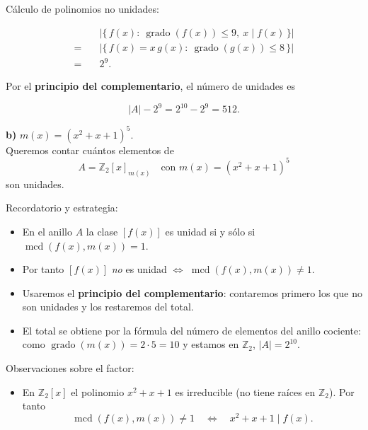 \documentclass[a4paper,12pt]{article}
\begin{document}
\begin{ejercicio}[title=Ejercicio 10]
\vspace{0.5em}

Cálculo de polinomios no unidades:

\[
\begin{aligned}
&\left|\{\,f(x):\ \operatorname{grado}(f(x))\le 9,\ x\mid f(x)\,\}\right| \\
=\quad&\left|\{\,f(x)=x\,g(x):\ \operatorname{grado}(g(x))\le 8\,\}\right| \\
=\quad&2^{9}.
\end{aligned}
\]

Por el \textbf{principio del complementario}, el número de unidades es

\[
|A| - 2^{9} = 2^{10} - 2^{9} = \boxed{512}.
\]

\end{ejercicio}
\begin{ejercicio}[title=Ejercicio 10]

\textbf{b)} \quad $m(x)=(x^2+x+1)^5$. \\

Queremos contar cuántos elementos de 
\[
A=\mathbb{Z}_2[x]_{m(x)}\quad\text{con }m(x)=(x^2+x+1)^5
\]
son unidades.

\vspace{0.5em}

Recordatorio y estrategia:
\begin{itemize}
\item En el anillo \(A\) la clase \([f(x)]\) es unidad si y sólo si \(\operatorname{mcd}(f(x),m(x))=1\).
\item Por tanto \([f(x)]\) \emph{no} es unidad \(\Longleftrightarrow\) \(\operatorname{mcd}(f(x),m(x))\neq 1\).
\item Usaremos el \textbf{principio del complementario}: contaremos primero los que no son unidades y los restaremos del total.
\item El total se obtiene por la fórmula del número de elementos del anillo cociente: como \(\operatorname{grado}(m(x))=2\cdot 5=10\) y estamos en \(\mathbb{Z}_2\), \(|A|=2^{10}\).
\end{itemize}

Observaciones sobre el factor:
\begin{itemize}
\item En \(\mathbb{Z}_2[x]\) el polinomio \(x^2+x+1\) es irreducible (no tiene raíces en \(\mathbb{Z}_2\)). Por tanto
\[
\operatorname{mcd}(f(x),m(x))\neq 1 \quad\Longleftrightarrow\quad x^2+x+1\mid f(x).
\]
\end{itemize}


\end{ejercicio}
\end{document}
